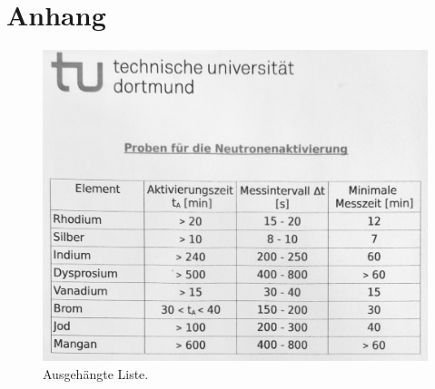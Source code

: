 \section*{Anhang}


\centering

\null\vfill
\begin{figure}
	\centering
	\includegraphics[width=0.5\paperwidth]{content/grafik/liste.jpg}
	\vspace{1ex}
	\caption{Ausgehängte Liste.}
	\label{fig:liste}
\end{figure}
\vfill\null
\newpage
\null\vfill
